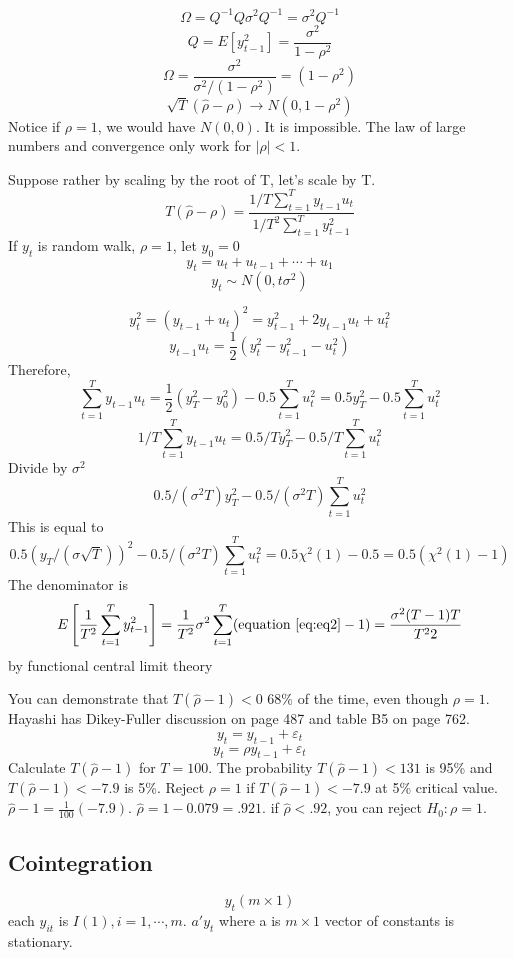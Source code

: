 \documentclass[11pt, a4paper, oneside]{article}
\theoremstyle{definition}
\theoremstyle{proposition}
\theoremstyle{corollary}
\theoremstyle{lemma}
\theoremstyle{theorem}
\begin{document}
$$\Omega = Q^{-1}Q\sigma^2 Q^{-1} = \sigma^2 Q^{-1}$$
$$Q = E[y_{t-1}^2] = \frac{\sigma^2}{1- \rho^2}$$
$$\Omega = \frac{\sigma^2}{\sigma^2/(1- \rho^2)} = (1- \rho^2)$$
$$\sqrt{T}(\hat{\rho} -\rho) \to N(0, 1- \rho^2)$$ 
Notice if $\rho =1$, we would have $N(0, 0)$. It is impossible. The law of large numbers and convergence only work for $|\rho| < 1$. 

Suppose rather by scaling by the root of T, let's scale by T. 
$$T(\hat{\rho} - \rho) = \frac{1/T\sum_{t=1}^T y_{t-1}u_t}{1/T^2\sum_{t=1}^Ty_{t-1}^2}$$
If $y_t$ is random walk, $\rho = 1$, let $y_0 = 0$
$$y_t = u_t+  u_{t -1} + \cdots + u_1$$
\begin{equation}\label{eq:eq2}
y_t \sim N(0, t \sigma^2)
\end{equation}

$$y_t^2 = (y_{t-1} + u_t)^2 = y_{t-1}^2 + 2 y_{t-1}u_t + u_t^2 $$
$$y_{t-1}u_t = \frac{1}{2}(y_t^2 - y_{t-1}^2 - u_t^2)$$
Therefore, $$\sum_{t=1}^T y_{t-1}u_t = \frac{1}{2}(y_T^2 - y_0^2) - 0.5\sum_{t=1}^T u_t^2 = 0.5y_T^2 - 0.5\sum_{t=1}^T u_t^2$$
$$1/T\sum_{t=1}^T y_{t-1}u_t  = 0.5/Ty_T^2 - 0.5/T\sum_{t=1}^T u_t^2$$
Divide by $\sigma^2$ 
$$0.5/(\sigma^2T)y_T^2 - 0.5/(\sigma^2T)\sum_{t=1}^T u_t^2$$
This is equal to 
$$0.5(y_T/(\sigma \sqrt{T}))^2 - 0.5/(\sigma^2T)\sum_{t=1}^T u_t^2= 0.5\chi^2(1) - 0.5 =0.5(\chi^2(1) - 1)$$
The denominator is
$$E\left[\frac{1}{T^2}\sum_{t=1}^T y_{t-1}^2\right] = \frac{1}{T^2}\sigma^2 \sum_{t=1}^T(\text{equation } \ref{eq:eq2}-1) = \frac{\sigma^2(T-1)T}{T^2 2}$$ by functional central limit theory

You can demonstrate that $T(\hat{\rho} - 1) < 0$ 68\% of the time, even though $\rho = 1$. Hayashi has Dikey-Fuller discussion on page 487 and table B5 on page 762. 
$$y_t = y_{t-1} + \varepsilon_t$$
$$y_t = \rho y_{t -1}+\varepsilon_t$$
Calculate $T(\hat{\rho} - 1)$ for $T= 100$. The probability $T(\hat{\rho} -1) < 131$ is 95\% and $T(\hat{\rho}- 1) < -7.9$ is 5\%. Reject $\rho =1$ if $T(\hat{\rho} -1) < -7.9$ at 5\% critical value. $\hat{\rho} -1 = \frac{1}{100} (-7.9)$. $\hat{\rho} = 1 - 0.079 = .921$. if $\hat{\rho} < .92$, you can reject $H_0: \rho = 1$. 

\subsection{Cointegration}
$$y_t (m \times 1)$$ each $y_{it}$ is $I(1), i = 1, \cdots, m$. $a'y_t$ where a is $m \times 1$ vector of constants is stationary. 
\end{document}
